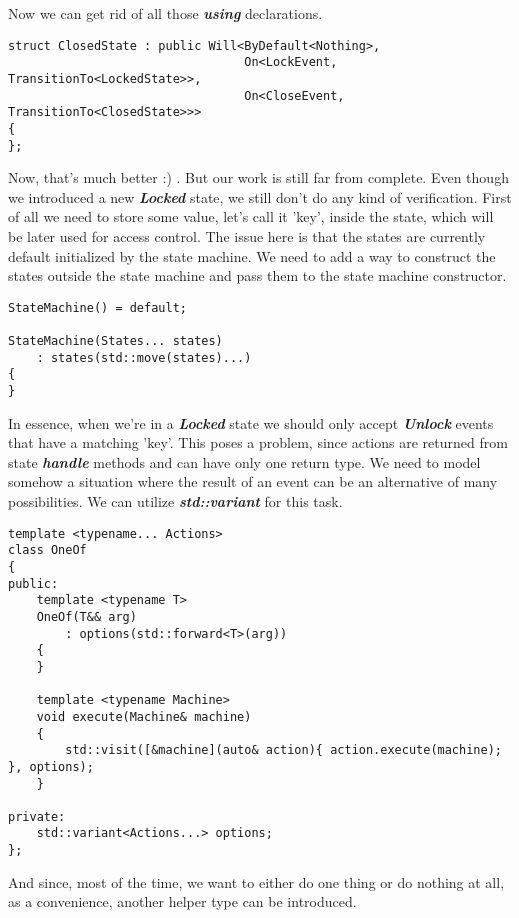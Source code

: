 \documentclass{article}[8pt]
\newcommand{\code}[1]{\textbf{\textit{#1}}}
\newcommand{\locked}{\code{Locked}}
\newcommand{\unlock}{\code{Unlock}}
\begin{document}
\bigskip
\inputminted[firstline=3]{c++}{../fsm/actions/Will.h}
\bigskip

Now we can get rid of all those \code{using} declarations.

\bigskip
\begin{verbatim}
struct ClosedState : public Will<ByDefault<Nothing>,
								 On<LockEvent, TransitionTo<LockedState>>,
								 On<CloseEvent, TransitionTo<ClosedState>>>
{
};
\end{verbatim}
\bigskip

Now, that's much better :) . But our work is still far from complete. Even though we introduced a new \locked{} state, we still don't do any kind of verification. First of all we need to store some value, let's call it 'key', inside the state, which will be later used for access control. The issue here is that the states are currently default initialized by the state machine. We need to add a way to construct the states outside the state machine and pass them to the state machine constructor.

\bigskip
\begin{verbatim}
StateMachine() = default;

StateMachine(States... states)
	: states(std::move(states)...)
{
}
\end{verbatim}
\bigskip

In essence, when we're in a \locked{} state we should only accept \unlock{} events that have a matching 'key'. This poses a problem, since actions are returned from state \code{handle} methods and can have only one return type. We need to model somehow a situation where the result of an event can be an alternative of many possibilities. We can utilize \code{std::variant} for this task.

\bigskip
\begin{verbatim}
template <typename... Actions>
class OneOf
{
public:
	template <typename T>
	OneOf(T&& arg)
		: options(std::forward<T>(arg))
	{
	}

	template <typename Machine>
	void execute(Machine& machine)
	{
		std::visit([&machine](auto& action){ action.execute(machine); }, options);
	}

private:
	std::variant<Actions...> options;
};
\end{verbatim}
\bigskip

And since, most of the time, we want to either do one thing or do nothing at all, as a convenience, another helper type can be introduced.

\bigskip
\inputminted[firstline=5]{c++}{../fsm/actions/Maybe.h}
\bigskip
\end{document}
